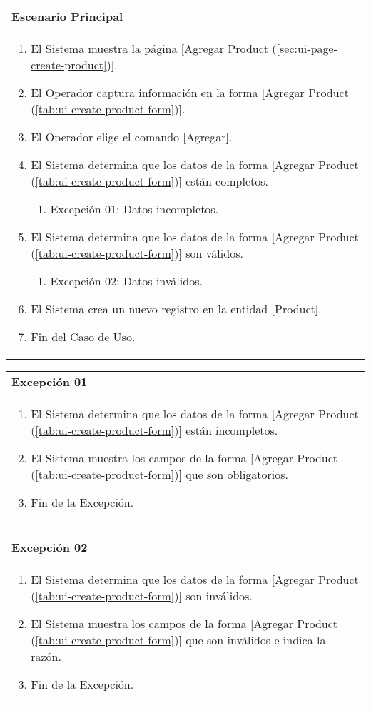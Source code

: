 	\begin{tabular}{ p{15.5cm} }
		\textbf{Escenario Principal} \\
		\begin{enumerate}
			\item El Sistema muestra la p\'agina [Agregar Product (\ref{sec:ui-page-create-product})].
			\item El Operador captura informaci\'on en la forma [Agregar Product (\ref{tab:ui-create-product-form})].
			\item El Operador elige el comando [Agregar].
			\item El Sistema determina que los datos de la forma [Agregar Product (\ref{tab:ui-create-product-form})] est\'an completos.
				\begin{enumerate}
					\item Excepci\'on 01: Datos incompletos.
				\end{enumerate}
			\item El Sistema determina que los datos de la forma [Agregar Product (\ref{tab:ui-create-product-form})] son v\'alidos.
				\begin{enumerate}
					\item Excepci\'on 02: Datos inv\'alidos.
				\end{enumerate}
			\item El Sistema crea un nuevo registro en la entidad [Product].
			\item Fin del Caso de Uso.
		\end{enumerate}
	\end{tabular}
	
	\begin{tabular}{ p{15.5cm} }
		\textbf{Excepci\'on 01} \\
		\begin{enumerate}
			\item El Sistema determina que los datos de la forma [Agregar Product (\ref{tab:ui-create-product-form})] est\'an incompletos.
			\item El Sistema muestra los campos de la forma [Agregar Product (\ref{tab:ui-create-product-form})] que son obligatorios.
			\item Fin de la Excepci\'on.
		\end{enumerate}
	\end{tabular}
	
	\begin{tabular}{ p{15.5cm} }
		\textbf{Excepci\'on 02} \\
		\begin{enumerate}
			\item El Sistema determina que los datos de la forma [Agregar Product (\ref{tab:ui-create-product-form})] son inv\'alidos.
			\item El Sistema muestra los campos de la forma [Agregar Product (\ref{tab:ui-create-product-form})] que son inv\'alidos e indica la raz\'on.
			\item Fin de la Excepci\'on.
		\end{enumerate}
	\end{tabular}
	
